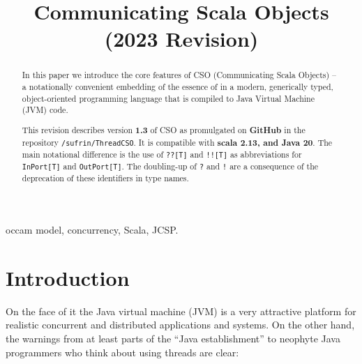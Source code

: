 \documentclass[12pt]{IOS-Book-Article-CPA-2017}
\begin{document}
\begin{frontmatter}
\setcounter{page}{1}
\title{Communicating Scala Objects\\ (2023 Revision)}

\author{ }
\address{
Oxford University Department of Computer Science\\
   Oxford OX1 3QD, England
   \\[4pt]
   {\small {\tt Bernard.Sufrin@cs.ox.ac.uk}}
}



\begin{abstract}
   In this paper we introduce the core features of CSO (Communicating
   Scala Objects) -- a notationally convenient embedding of the
   essence of \occam in a modern, generically typed, object-oriented
   programming language that is compiled to Java Virtual Machine
   (JVM) code.
      
   \noindent This revision describes version \textbf{1.3} of CSO as promulgated on
          \textbf{GitHub} in the repository \texttt{/sufrin/ThreadCSO}. It is
           compatible with \textbf{scala 2.13, and \textbf{Java 20}}. {The
           main notational difference is the use of \texttt{??[T]} and \texttt{!![T]}
           as abbreviations for \texttt{InPort[T]} and \texttt{OutPort[T]}. The
           doubling-up of \texttt{?} and \texttt{!} are a consequence of
           the deprecation of these identifiers in type names.           
          } 
   
\end{abstract}

\begin{keyword}
\textsf{occam} model\sep
concurrency\sep
Scala\sep
JCSP.%
\end{keyword}
\end{frontmatter}





\section*{Introduction}

On the face of it the Java virtual machine (JVM) is a very attractive platform for 
realistic concurrent and distributed applications and systems. On
the other hand, the warnings from at least parts of the ``Java establishment'' 
to neophyte Java programmers who think about using
threads are clear:
\end{document}

